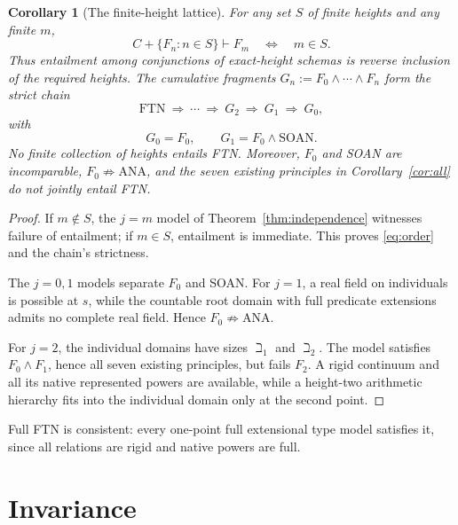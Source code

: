 \documentclass[11pt,letterpaper,numbers=noenddot]{scrartcl}
\numberwithin{equation}{section}
\newtheorem{corollary}[theorem]{Corollary}
\theoremstyle{definition}
\newcommand{\FTN}{\mathrm{FTN}}
\newcommand{\SOAN}{\mathrm{SOAN}}
\newcommand{\ANA}{\mathrm{ANA}}
\begin{document}
\begin{corollary}[The finite-height lattice]\label{cor:order}\label{cor:strict-old}
For any set $S$ of finite heights and any finite $m$,
\begin{equation}\label{eq:order}
C+\{F_n:n\in S\}\vdash F_m
\quad\Longleftrightarrow\quad m\in S.
\end{equation}
Thus entailment among conjunctions of exact-height schemas is reverse inclusion of the required heights. The cumulative fragments $G_n:=F_0\land\cdots\land F_n$ form the strict chain
\begin{equation}\label{eq:strict-chain}
\FTN\ \Longrightarrow\ \cdots\ \Longrightarrow\ G_2
\ \Longrightarrow\ G_1
\ \Longrightarrow\ G_0,
\end{equation}
with
\[
G_0=F_0,\qquad G_1=F_0\land\SOAN.
\]
No finite collection of heights entails FTN. Moreover, $F_0$ and SOAN are incomparable, $F_0\not\Rightarrow\ANA$, and the seven existing principles in Corollary~\ref{cor:all} do not jointly entail FTN.
\end{corollary}

\begin{proof}
If $m\notin S$, the $j=m$ model of Theorem~\ref{thm:independence} witnesses failure of entailment; if $m\in S$, entailment is immediate. This proves \eqref{eq:order} and the chain's strictness.

The $j=0,1$ models separate $F_0$ and SOAN. For $j=1$, a real field on individuals is possible at $s$, while the countable root domain with full predicate extensions admits no complete real field. Hence $F_0\not\Rightarrow\ANA$.

For $j=2$, the individual domains have sizes $\beth_1$ and $\beth_2$. The model satisfies $F_0\land F_1$, hence all seven existing principles, but fails $F_2$. A rigid continuum and all its native represented powers are available, while a height-two arithmetic hierarchy fits into the individual domain only at the second point.
\end{proof}

Full FTN is consistent: every one-point full extensional type model satisfies it, since all relations are rigid and native powers are full.

\clearpage
\appendix
\section{Invariance}\label{sec:invariance}
\end{document}
